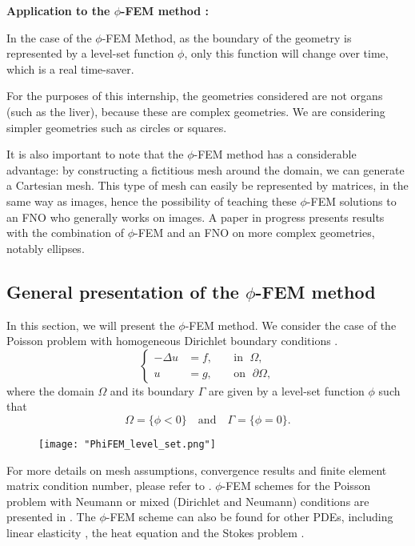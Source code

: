 \textbf{Application to the $\phi$-FEM method :}

In the case of the $\phi$-FEM Method, as the boundary of the geometry is represented by a level-set function $\phi$, only this function will change over time, which is a real time-saver.

For the purposes of this internship, the geometries considered are not organs (such as the liver), because these are complex geometries. We are considering simpler geometries such as circles or squares. 

It is also important to note that the $\phi$-FEM method has a considerable advantage: by constructing a fictitious mesh around the domain, we can generate a Cartesian mesh. This type of mesh can easily be represented by matrices, in the same way as images, hence the possibility of teaching these $\phi$-FEM solutions to an FNO who generally works on images. A paper in progress presents results with the combination of $\phi$-FEM and an FNO on more complex geometries, notably ellipses.

\subsection{General presentation of the $\phi$-FEM method} \label{FEMs.PhiFEM.Pres}

In this section, we will present the $\phi$-FEM method. We consider the case of the Poisson problem with homogeneous Dirichlet boundary conditions \cite{duprez_phi-fem_2020}. 
\begin{equation}
	\left\{
	\begin{aligned}
		-\Delta u &= f, \; &&\text{in } \; \Omega, \\
		u&=g, \; &&\text{on } \; \partial\Omega,
	\end{aligned}
	\right.
	\label{eq.Poisson}
\end{equation}
where the domain $\Omega$ and its boundary $\Gamma$ are given by a level-set function $\phi$ such that
\begin{equation*}
	\Omega=\{\phi < 0\} \quad \text{and} \quad \Gamma=\{\phi = 0\}.
\end{equation*}

\begin{figure}[H]
	\centering
	\texttt{[image: "PhiFEM\_level\_set.png"]}
	\label{space1}
\end{figure}

\begin{Rem}
	For more details on mesh assumptions, convergence results and finite element matrix condition number, please refer to \cite{duprez_phi-fem_2020}. $\phi$-FEM schemes for the Poisson problem with Neumann or mixed (Dirichlet and Neumann) conditions are presented in \cite{duprez_new_2023,cotin_phi-fem_nodate}. The $\phi$-FEM scheme can also be found for other PDEs, including linear elasticity \cite[Chapter~2]{cotin_phi-fem_nodate}, the heat equation \cite[Chapter~5]{cotin_phi-fem_nodate} and the Stokes problem \cite{duprez_phi-fem_2023}.
\end{Rem}

